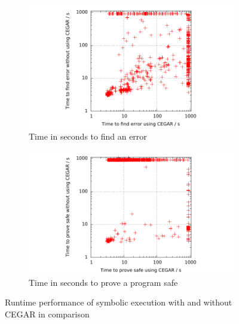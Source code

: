 \begin{figure}[t]
\begin{subfigure}[b]{.48\textwidth}
\includegraphics[trim=2cm 0 1cm 0, clip=true, scale=.9]{evaluation/sp_timeToFindError_cegar_noCegar}
\caption{Time in seconds to find an error}
\label{fig:spTimeToFindError}
\end{subfigure}%
\hfill
\begin{subfigure}[b]{.48\textwidth}
\includegraphics[trim=2cm 0 1cm 0, clip=true, scale=.9]{evaluation/sp_timeToProveTrue_cegar_noCegar}
\caption{Time in seconds to prove a program safe}
\label{fig:spTimeToProveSafe}
\end{subfigure}
\caption{Runtime performance of symbolic execution with and without CEGAR in comparison}
\end{figure}

